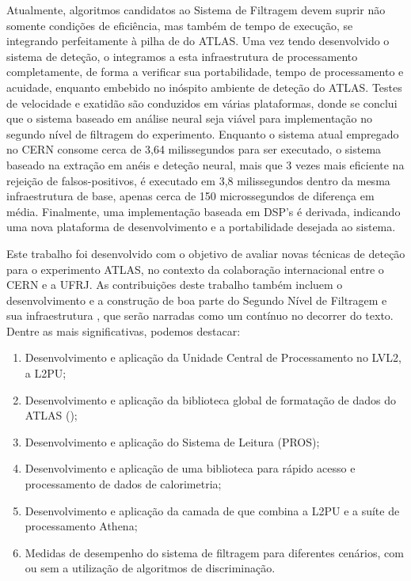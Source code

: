 Atualmente, algoritmos candidatos ao Sistema de Filtragem devem suprir não
somente condições de eficiência, mas também de tempo de execução, se
integrando perfeitamente à pilha de  do ATLAS. Uma vez tendo
desenvolvido o sistema de deteção, o integramos a esta infraestrutura de
processamento completamente, de forma a verificar sua portabilidade, tempo de
processamento e acuidade, enquanto embebido no inóspito ambiente de deteção do
ATLAS. Testes de velocidade e exatidão são conduzidos em várias plataformas,
donde se conclui que o sistema baseado em análise neural seja viável para
implementação no segundo nível de filtragem do experimento. Enquanto o sistema
atual empregado no CERN consome cerca de 3,64 milissegundos para ser
executado, o sistema baseado na extração em anéis e deteção neural, mais que 3
vezes mais eficiente na rejeição de falsos-positivos, é executado em 3,8
milissegundos dentro da mesma infraestrutura de base, apenas cerca de 150
microssegundos de diferença em média. Finalmente, uma implementação baseada em
DSP's é derivada, indicando uma nova plataforma de desenvolvimento e a
portabilidade desejada ao sistema.

Este trabalho foi desenvolvido com o objetivo de avaliar novas técnicas de
deteção para o experimento ATLAS, no contexto da colaboração internacional
entre o CERN e a UFRJ. As contribuições deste trabalho também incluem o
desenvolvimento e a construção de boa parte do Segundo Nível de Filtragem e sua
infraestrutura , que serão narradas como um contínuo no decorrer do
texto. Dentre as mais significativas, podemos destacar:

\begin{enumerate}
\item Desenvolvimento e aplicação da Unidade Central de Processamento no
LVL2, a L2PU;
\item Desenvolvimento e aplicação da biblioteca global de formatação de dados
do ATLAS ();
\item Desenvolvimento e aplicação do  Sistema de Leitura (PROS);
\item Desenvolvimento e aplicação de uma biblioteca para rápido acesso e
processamento de dados de calorimetria;
\item Desenvolvimento e aplicação da camada de  que combina a
L2PU e a suíte de processamento  Athena;
\item Medidas de desempenho do sistema de filtragem para diferentes cenários,
com ou sem a utilização de algoritmos de discriminação.
\end{enumerate}


